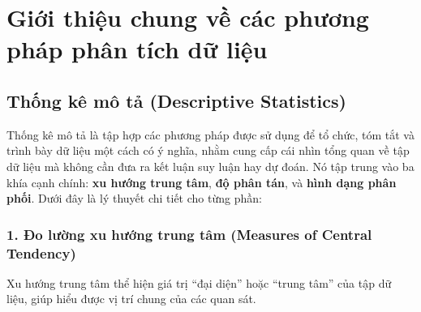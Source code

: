 \documentclass[a4paper,12pt]{article}
\begin{document}
\section{Giới thiệu chung về các phương pháp phân tích dữ liệu}
\subsection*{Thống kê mô tả (Descriptive Statistics)}

Thống kê mô tả là tập hợp các phương pháp được sử dụng để tổ chức, tóm tắt và trình bày dữ liệu một cách có ý nghĩa, nhằm cung cấp cái nhìn tổng quan về tập dữ liệu mà không cần đưa ra kết luận suy luận hay dự đoán. Nó tập trung vào ba khía cạnh chính: \textbf{xu hướng trung tâm}, \textbf{độ phân tán}, và \textbf{hình dạng phân phối}. Dưới đây là lý thuyết chi tiết cho từng phần:

\subsubsection*{1. Đo lường xu hướng trung tâm (Measures of Central Tendency)}
Xu hướng trung tâm thể hiện giá trị ``đại diện'' hoặc ``trung tâm'' của tập dữ liệu, giúp hiểu được vị trí chung của các quan sát.
\end{document}
